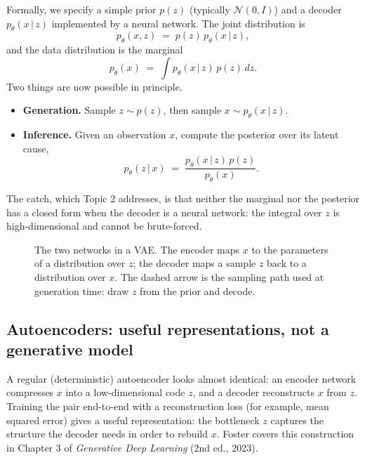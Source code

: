 \documentclass[11pt]{article}
\newcommand{\given}{\,\vert\,}
\theoremstyle{remark}
\begin{document}
Formally, we specify a simple prior $p(z)$ (typically $\mathcal N(0,I)$) and a decoder $p_\theta(x\given z)$ implemented by a neural network. The joint distribution is
\[
p_\theta(x,z) \;=\; p(z)\,p_\theta(x\given z),
\]
and the data distribution is the marginal
\[
p_\theta(x) \;=\; \int p_\theta(x\given z)\,p(z)\,dz .
\]
Two things are now possible in principle.
\begin{itemize}[leftmargin=1.2em]
  \item \textbf{Generation.} Sample $z\sim p(z)$, then sample $x\sim p_\theta(x\given z)$.
  \item \textbf{Inference.} Given an observation $x$, compute the posterior over its latent cause,
  \[
  p_\theta(z\given x) \;=\; \frac{p_\theta(x\given z)\,p(z)}{p_\theta(x)} .
  \]
\end{itemize}
The catch, which Topic 2 addresses, is that neither the marginal nor the posterior has a closed form when the decoder is a neural network: the integral over $z$ is high-dimensional and cannot be brute-forced.

\begin{figure}[h]
\centering
{}
\caption{The two networks in a VAE. The encoder maps $x$ to the parameters of a distribution over $z$; the decoder maps a sample $z$ back to a distribution over $x$. The dashed arrow is the sampling path used at generation time: draw $z$ from the prior and decode.}
\end{figure}

\subsection{Autoencoders: useful representations, not a generative model}
A regular (deterministic) autoencoder looks almost identical: an encoder network compresses $x$ into a low-dimensional code $z$, and a decoder reconstructs $x$ from $z$. Training the pair end-to-end with a reconstruction loss (for example, mean squared error) gives a useful representation: the bottleneck $z$ captures the structure the decoder needs in order to rebuild $x$. Foster covers this construction in Chapter 3 of \emph{Generative Deep Learning} (2nd ed., 2023).
\end{document}
